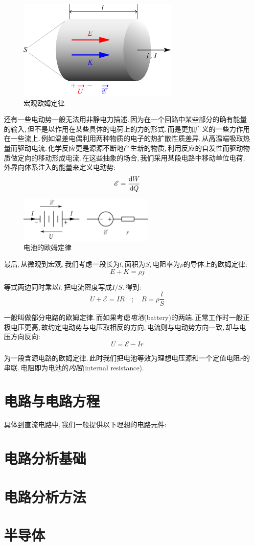 \begin{figure}
\centering
\vspace{-0.5cm}
\includegraphics[width=8cm]{image/7-3-6.png}
\caption{宏观欧姆定律}
\end{figure}
还有一些电动势一般无法用非静电力描述.\,因为在一个回路中某些部分的确有能量的输入,\,但不是以作用在某些具体的电荷上的力的形式.\,而是更加广义的一些力作用在一些流上.\,例如温差电偶利用两种物质的电子的热扩散性质差异,\,从高温端吸取热量而驱动电流.\,化学反应更是源源不断地产生新的物质,\,利用反应的自发性而驱动物质做定向的移动形成电流.\,在这些抽象的场合,\,我们采用某段电路中移动单位电荷,\,外界向体系注入的能量来定义电动势:
\[\mathscr{E}=\frac{\textrm{d} W}{\textrm{d} Q}\]

\begin{figure}[H]
\centering
\includegraphics[width=0.6\textwidth]{image/7-3-7.png}
\caption{电池的欧姆定律}
\end{figure}
最后,\,从微观到宏观,\,我们考虑一段长为$l$,\,面积为$S$,\,电阻率为$\rho$的导体上的欧姆定律:
\[E+K=\rho j\]

等式两边同时乘以$l$,\,把电流密度写成$I/S$.\,得到:
\[U+\mathscr{E}=IR \quad;\quad R=\rho\frac{l}{S}\]

一般叫做部分电路的欧姆定律.\,而如果考虑\emph{电池}(battery)的两端,\,正常工作时一般正极电压更高,\,故约定电动势与电压取相反的方向,\,电流则与电动势方向一致,\,却与电压方向反向:
\[U=\mathscr{E}-Ir\]

为一段含源电路的欧姆定律.\,此时我们把电池等效为理想电压源和一个定值电阻$r$的串联.\,电阻即为电池的\emph{内阻}(internal resistance).






\section{电路与电路方程}

具体到直流电路中,\,我们一般提供以下理想的电路元件:

\section{电路分析基础}

\section{电路分析方法}

\section{半导体}
